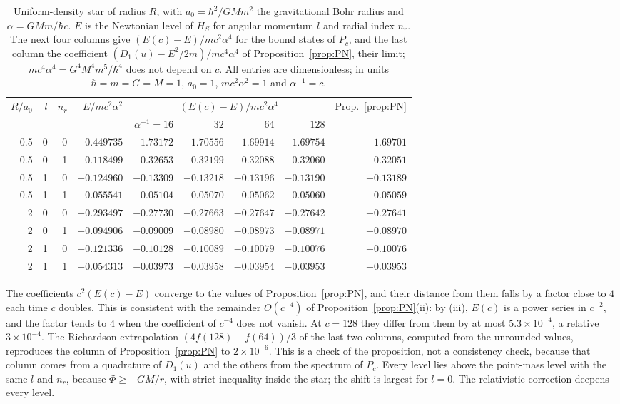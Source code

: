 \documentclass[%
 aip,
 jmp,
 amsmath,amssymb,
 reprint, onecolumn
]{revtex4-1}
\theoremstyle{definition}
\theoremstyle{remark}
\begin{document}
\begin{table}[htb]
\caption{Uniform-density star of radius $R$, with $a_0=\hbar^2/GMm^2$
the gravitational Bohr radius and $\alpha=GMm/\hbar c$. $E$ is the
Newtonian level of $H_S$ for angular momentum $l$ and radial index
$n_r$. The next four columns give $(E(c)-E)/mc^2\alpha^4$ for the bound
states of $P_c$, and the last column the coefficient
$(D_1(u)-E^2/2m)/mc^4\alpha^4$ of Proposition~\ref{prop:PN}, their limit;
$mc^4\alpha^4=G^4M^4m^5/\hbar^4$ does not depend on $c$. All entries are
dimensionless; in units $\hbar=m=G=M=1$, $a_0=1$, $mc^2\alpha^2=1$ and
$\alpha^{-1}=c$.}
\label{tab:stars}
\begin{ruledtabular}
\begin{tabular}{rrrrrrrrr}
$R/a_0$ & $l$ & $n_r$ & $E/mc^2\alpha^2$ &
\multicolumn{4}{c}{$(E(c)-E)/mc^2\alpha^4$} & Prop.~\ref{prop:PN}\\
 & & & & $\alpha^{-1}=16$ & $32$ & $64$ & $128$ & \\
\hline
0.5 & 0 & 0 & $-0.449735$ & $-1.73172$ & $-1.70556$ & $-1.69914$ & $-1.69754$ & $-1.69701$\\
0.5 & 0 & 1 & $-0.118499$ & $-0.32653$ & $-0.32199$ & $-0.32088$ & $-0.32060$ & $-0.32051$\\
0.5 & 1 & 0 & $-0.124960$ & $-0.13309$ & $-0.13218$ & $-0.13196$ & $-0.13190$ & $-0.13189$\\
0.5 & 1 & 1 & $-0.055541$ & $-0.05104$ & $-0.05070$ & $-0.05062$ & $-0.05060$ & $-0.05059$\\
2 & 0 & 0 & $-0.293497$ & $-0.27730$ & $-0.27663$ & $-0.27647$ & $-0.27642$ & $-0.27641$\\
2 & 0 & 1 & $-0.094906$ & $-0.09009$ & $-0.08980$ & $-0.08973$ & $-0.08971$ & $-0.08970$\\
2 & 1 & 0 & $-0.121336$ & $-0.10128$ & $-0.10089$ & $-0.10079$ & $-0.10076$ & $-0.10076$\\
2 & 1 & 1 & $-0.054313$ & $-0.03973$ & $-0.03958$ & $-0.03954$ & $-0.03953$ & $-0.03953$\\
\end{tabular}
\end{ruledtabular}
\end{table}

The coefficients $c^2(E(c)-E)$ converge to the values of
Proposition~\ref{prop:PN}, and their distance from them falls by a factor
close to $4$ each time $c$ doubles. This is consistent with the
remainder $O(c^{-4})$ of Proposition~\ref{prop:PN}(ii): by (iii), $E(c)$
is a power series in $c^{-2}$, and the factor tends to $4$ when the
coefficient of $c^{-4}$ does not vanish. At $c=128$ they differ from them by
at most $5.3\times10^{-4}$, a relative $3\times10^{-4}$. The Richardson
extrapolation $(4f(128)-f(64))/3$ of the last two columns, computed
from the unrounded values, reproduces the
column of Proposition~\ref{prop:PN} to $2\times10^{-6}$. This is a check
of the proposition, not a consistency check, because that column comes
from a quadrature of $D_1(u)$ and the others from the spectrum of $P_c$.
Every level lies above the point-mass level with the same $l$ and $n_r$,
because $\Phi\geq-GM/r$, with strict inequality inside the star; the
shift is largest for $l=0$. The relativistic correction deepens every
level.
\end{document}
